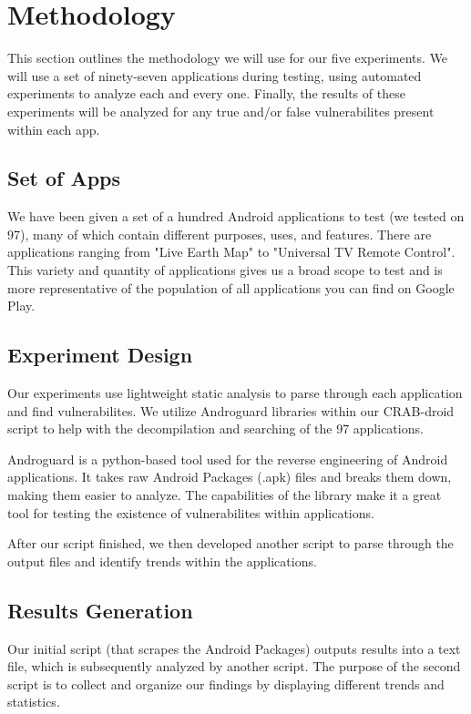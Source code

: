 \section{Methodology}
\label{sec:overview} 

This section outlines the methodology we will use for our five experiments.
We will use a set of ninety-seven applications during testing, using
automated experiments to analyze each and every one. Finally, the results
of these experiments will be analyzed for any true and/or false vulnerabilites
present within each app.

\subsection{Set of Apps}

We have been given a set of a hundred Android applications to test (we tested on 97), many of 
which contain different purposes, uses, and features. There are 
applications ranging from "Live Earth Map" to "Universal TV Remote Control".
This variety and quantity of applications gives us a broad scope to test and is 
more representative of the population of all applications you can find on 
Google Play.

\subsection{Experiment Design}

Our experiments use lightweight static analysis to parse through each
application and find vulnerabilites. We utilize Androguard libraries within our
CRAB-droid script to help with the decompilation and searching of the 97 applications.

Androguard is a python-based tool used for the reverse engineering of
Android applications. It takes raw Android Packages (.apk) files and breaks
them down, making them easier to analyze. The capabilities of the library make it
a great tool for testing the existence of vulnerabilites within applications.

After our script finished, we then developed another script to parse through the output files and identify
trends within the applications.

\subsection{Results Generation}

Our initial script (that scrapes the Android Packages) outputs results into a text file, 
which is subsequently analyzed by another script. The purpose of the second script is to
collect and organize our findings by displaying different trends and statistics.

